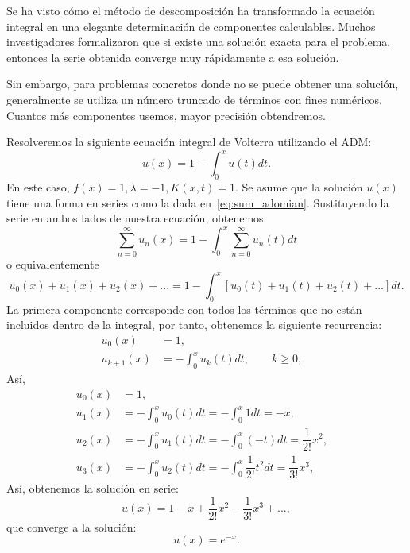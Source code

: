 \begin{observacion}
Se ha visto cómo el método de descomposición ha transformado la ecuación integral en una elegante determinación de componentes calculables. Muchos investigadores formalizaron que si existe una solución exacta para el problema, entonces la serie obtenida converge muy rápidamente a esa solución.

Sin embargo, para problemas concretos donde no se puede obtener una solución, generalmente se utiliza un número truncado de términos con fines numéricos. Cuantos más componentes usemos, mayor precisión obtendremos.
\end{observacion}

\begin{ejemplo}
	Resolveremos la siguiente ecuación integral de Volterra utilizando el ADM:
	\begin{equation}
		u(x) = 1 - \int_{0}^{x} u(t)dt.
	\end{equation}
	En este caso, $f(x) = 1, \lambda = -1, K(x,t) = 1.$ Se asume que la solución $u(x)$ tiene una forma en series como la dada en~\eqref{eq:sum_adomian}. Sustituyendo la serie en ambos lados de nuestra ecuación, obtenemos:
	\begin{equation}
		\sum_{n=0}^{\infty} u_n(x) = 1 - \int_{0}^{x} \sum_{n=0}^{\infty} u_n(t)dt
	\end{equation}
	o equivalentemente
	\begin{equation}
		u_0(x) + u_1(x) + u_2(x) + ... = 1 - \int_0^x [u_0(t) + u_1(t) + u_2(t) + ...]dt.
	\end{equation}
	La primera componente corresponde con todos los términos que no están incluidos dentro de la integral, por tanto, obtenemos la siguiente recurrencia:
	\begin{align}
		u_0(x) &= 1,      &   \\
		u_{k+1}(x) &= - \int_{0}^{x} u_k(t)dt, \qquad k \geqslant 0,         & 
	\end{align}
	Así,
	\begin{align}
		u_0(x) &= 1,      &   \\
		u_{1}(x) &= - \int_{0}^{x} u_0(t)dt = -\int_{0}^{x} 1dt = -x,    &  \\
		u_{2}(x) &= - \int_{0}^{x} u_1(t)dt = -\int_{0}^{x} (-t)dt = \dfrac{1}{2!}x^2,    &  \\
		u_{3}(x) &= - \int_{0}^{x} u_2(t)dt = -\int_{0}^{x} \dfrac{1}{2!}t^2dt = \dfrac{1}{3!}x^3,    & 
	\end{align}	
	Así, obtenemos la solución en serie:
	\begin{equation}
		u(x) = 1 - x + \dfrac{1}{2!}x^2 - \dfrac{1}{3!}x^3 + ...,
	\end{equation}
	que converge a la solución:
	\begin{equation}
		u(x) = e^{-x}.
	\end{equation}
\end{ejemplo}

